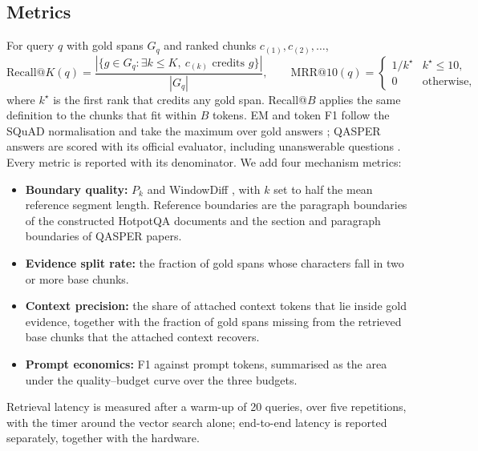 \documentclass[10pt,a4paper]{article}
\begin{document}
\subsection{Metrics}
For query $q$ with gold spans $G_q$ and ranked chunks $c_{(1)},c_{(2)},\ldots$,
\begin{equation}
\mathrm{Recall@}K(q)=\frac{\left|\{g\in G_q:\exists k\le K,\ c_{(k)}\text{ credits }g\}\right|}{|G_q|},\qquad
\mathrm{MRR@}10(q)=\begin{cases}1/k^\star & k^\star\le 10,\\ 0 & \text{otherwise,}\end{cases}
\end{equation}
where $k^\star$ is the first rank that credits any gold span. Recall@$B$ applies the same definition to the chunks that fit within $B$ tokens. EM and token F1 follow the SQuAD normalisation and take the maximum over gold answers \cite{rajpurkar2016squad}; QASPER answers are scored with its official evaluator, including unanswerable questions \cite{dasigi2021qasper}. Every metric is reported with its denominator. We add four mechanism metrics:
\begin{itemize}
  \item \textbf{Boundary quality:} $P_k$ and WindowDiff \cite{beeferman1999statistical,pevzner2002windowdiff}, with $k$ set to half the mean reference segment length. Reference boundaries are the paragraph boundaries of the constructed HotpotQA documents and the section and paragraph boundaries of QASPER papers.
  \item \textbf{Evidence split rate:} the fraction of gold spans whose characters fall in two or more base chunks.
  \item \textbf{Context precision:} the share of attached context tokens that lie inside gold evidence, together with the fraction of gold spans missing from the retrieved base chunks that the attached context recovers.
  \item \textbf{Prompt economics:} F1 against prompt tokens, summarised as the area under the quality--budget curve over the three budgets.
\end{itemize}
Retrieval latency is measured after a warm-up of 20 queries, over five repetitions, with the timer around the vector search alone; end-to-end latency is reported separately, together with the hardware.
\end{document}

